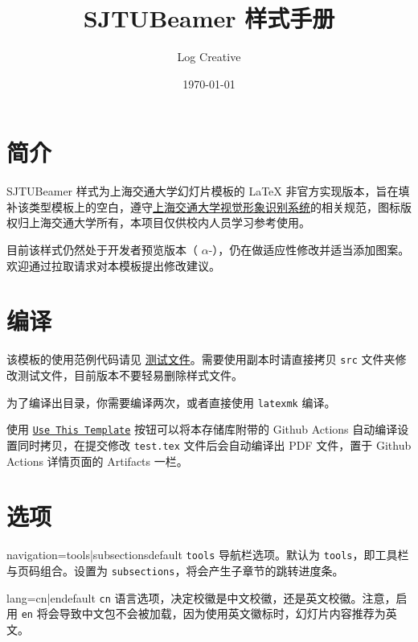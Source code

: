 \documentclass[a4paper,12pt]{article}
\begin{document}
\begin{CJK}{UTF8}{song}
\title{\textsf{SJTUBeamer} 样式手册}
\author{Log Creative}
\date{\today}
\maketitle

\tableofcontents    %

\section{简介}

\textsf{SJTUBeamer} 样式为上海交通大学幻灯片模板的 \LaTeX{} 非官方实现版本，旨在填补该类型模板上的空白，遵守\href{http://vi.sjtu.edu.cn/}{上海交通大学视觉形象识别系统}的相关规范，图标版权归上海交通大学所有，本项目仅供校内人员学习参考使用。

目前该样式仍然处于开发者预览版本（ $\alpha$-），仍在做适应性修改并适当添加图案。欢迎通过拉取请求对本模板提出修改建议。

\section{编译}

该模板的使用范例代码请见 \href{https://github.com/LogCreative/SJTUBeamer/blob/main/src/test.tex}{测试文件}。需要使用副本时请直接拷贝 \verb"src" 文件夹修改测试文件，目前版本不要轻易删除样式文件。

为了编译出目录，你需要编译两次，或者直接使用 \verb"latexmk" 编译。

使用 \href{https://github.com/LogCreative/SJTUBeamer/generate}{\texttt{Use This Template}} 按钮可以将本存储库附带的 Github Actions 自动编译设置同时拷贝，在提交修改 \verb"test.tex" 文件后会自动编译出 PDF 文件，置于 Github Actions 详情页面的 Artifacts 一栏。

\section{选项}

\begin{docKey*}[SJTUBeamer]{navigation}{=tools|subsections}{default \texttt{tools}}
    导航栏选项。默认为 \verb"tools"，即工具栏与页码组合。设置为 \verb"subsections"，将会产生子章节的跳转进度条。
\end{docKey*}

\begin{docKey*}[SJTUBeamer]{lang}{=cn|en}{default \texttt{cn}}
    语言选项，决定校徽是中文校徽，还是英文校徽。注意，启用 \texttt{en} 将会导致中文包不会被加载，因为使用英文徽标时，幻灯片内容推荐为英文。
\end{docKey*}


\end{CJK}
\end{document}
